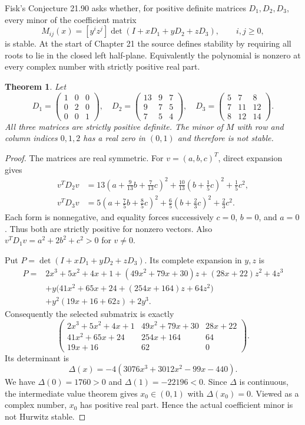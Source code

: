 \documentclass[11pt]{article}
\newtheorem{theorem}{Theorem}
\begin{document}
Fisk's Conjecture 21.90 asks whether, for positive definite matrices $D_1,D_2,D_3$, every minor of the coefficient matrix
\[
 M_{ij}(x)=[y^iz^j]\det(I+xD_1+yD_2+zD_3),\qquad i,j\geq0,
\]
is stable. At the start of Chapter 21 the source defines stability by requiring all roots to lie in the closed left half-plane. Equivalently the polynomial is nonzero at every complex number with strictly positive real part.
\begin{theorem}
Let
\[
D_1=\begin{pmatrix}1&0&0\\0&2&0\\0&0&1\end{pmatrix},\quad
D_2=\begin{pmatrix}13&9&7\\9&7&5\\7&5&4\end{pmatrix},\quad
D_3=\begin{pmatrix}5&7&8\\7&11&12\\8&12&14\end{pmatrix}.
\]
All three matrices are strictly positive definite. The minor of $M$ with row and column indices $0,1,2$ has a real zero in $(0,1)$ and therefore is not stable.
\end{theorem}
\begin{proof}
The matrices are real symmetric. For $v=(a,b,c)^T$, direct expansion gives
\begin{align*}
v^TD_2v&=13\left(a+\frac9{13}b+\frac7{13}c\right)^2
 +\frac{10}{13}\left(b+\frac15c\right)^2+\frac15c^2,\\
v^TD_3v&=5\left(a+\frac75b+\frac85c\right)^2
 +\frac65\left(b+\frac23c\right)^2+\frac23c^2.
\end{align*}
Each form is nonnegative, and equality forces successively $c=0$, $b=0$, and $a=0$. Thus both are strictly positive for nonzero vectors. Also $v^TD_1v=a^2+2b^2+c^2>0$ for $v\ne0$.

Put $P=\det(I+xD_1+yD_2+zD_3)$. Its complete expansion in $y,z$ is
\begin{align*}
P={}&2x^3+5x^2+4x+1+(49x^2+79x+30)z+(28x+22)z^2+4z^3\\
 &+y\bigl(41x^2+65x+24+(254x+164)z+64z^2\bigr)\\
 &+y^2(19x+16+62z)+2y^3.
\end{align*}
Consequently the selected submatrix is exactly
\[
 \begin{pmatrix}
2x^3+5x^2+4x+1&49x^2+79x+30&28x+22\\
41x^2+65x+24&254x+164&64\\
19x+16&62&0
\end{pmatrix}.
\]
Its determinant is
\[
\Delta(x)=-4(3076x^3+3012x^2-99x-440).
\]
We have $\Delta(0)=1760>0$ and $\Delta(1)=-22196<0$. Since $\Delta$ is continuous, the intermediate value theorem gives $x_0\in(0,1)$ with $\Delta(x_0)=0$. Viewed as a complex number, $x_0$ has positive real part. Hence the actual coefficient minor is not Hurwitz stable.
\end{proof}
\end{document}
